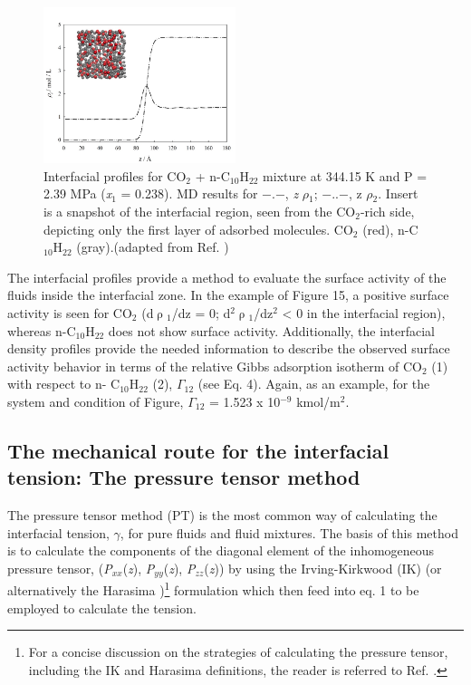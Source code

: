 \documentclass[9pt,bestpractices]{livecoms}
\begin{document}
\begin{figure}
\includegraphics[width=0.5\textwidth]{gfx/image54.jpeg}
\caption{Interfacial profiles for CO$_{2}$ + n-C$_{10}$H$_{22}$ mixture at 344.15 K and P = 2.39 MPa (\textit{x}$_{1}$ = 0.238). MD results for ${-}$.${-}$, \textit{z} \textendash{} ${\rho}$$_{1}$; ${-}$..${-}$, z\textendash{} ${\rho}$$_{2}$. Insert is a snapshot of the interfacial region, seen from the CO$_{2}$-rich side, depicting only the first layer of adsorbed molecules. CO$_{2}$ (red), n-C$_{10}$H$_{22}$ (gray).(adapted from Ref. \citep{mejia2014a})}
\label{fig:9}
\end{figure}

The interfacial profiles provide a method to evaluate the surface activity of
the fluids inside the interfacial zone. In the example of Figure 15, a positive
surface activity is seen for CO$_{2}$ (d${\uprho}$$_{1}$/dz = 0;
d$^{2}$${\uprho}$$_{1}$/dz$^{2}$ {\textless} 0 in the interfacial region),
whereas n-C$_{10}$H$_{22}$ does not show surface activity. Additionally, the
interfacial density profiles provide the needed information to describe the
observed surface activity behavior in terms of the relative Gibbs adsorption
isotherm of CO$_{2}$ (1) with respect to n- C$_{10}$H$_{22}$ (2),
${\Gamma}$$_{12}$ (see Eq. 4). Again, as an example, for the system and
condition of Figure, ${\Gamma}$$_{12}$ = 1.523 x 10$^{-9}$
kmol/m$^{2}$\citep{mejia2014a}.

\subsection{The mechanical route for the interfacial tension: The pressure tensor method}

The pressure tensor method (PT) is the most common way of calculating the
interfacial tension, {${\gamma}$}, for pure fluids and fluid mixtures. The
basis of this method is to calculate the components of the diagonal element of
the inhomogeneous pressure tensor, (\textit{P}$_{xx}$(\textit{z}),
\textit{P}$_{yy}$(\textit{z}), \textit{P}$_{zz}$(\textit{z})) by using the
Irving-Kirkwood (IK) \citep{irving1950}
(or alternatively the Harasima \citep{harasima1957})\footnote{For
a concise discussion on the strategies of calculating the pressure tensor,
including the IK and Harasima definitions, the reader is referred to Ref. \citep{long2013}.
}
formulation which
then feed into eq. 1 to be employed to calculate the tension. 
\end{document}

